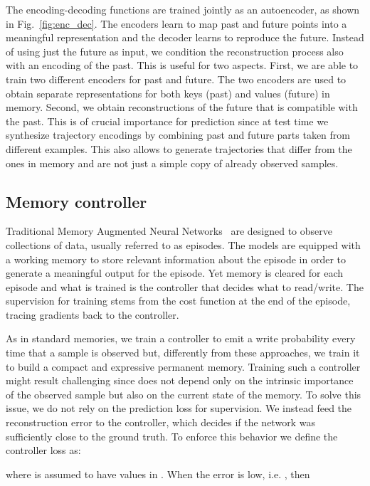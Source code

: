 \documentclass[10pt,twocolumn,letterpaper]{article}
\begin{document}
The encoding-decoding functions  are trained jointly as an autoencoder, as shown in Fig.~\ref{fig:enc_dec}.
The encoders learn to map past and future points into a meaningful representation and the decoder learns to reproduce the future. Instead of using just the future as input, we condition the reconstruction process also with an encoding of the past. This is useful for two aspects. First, we are able to train two different encoders for past and future. The two encoders are used to obtain separate representations for both keys (past) and values (future) in memory. Second, we obtain reconstructions of the future that is compatible with the past. This is of crucial importance for prediction since at test time we synthesize trajectory encodings by combining past and future parts taken from different examples. This also allows to generate trajectories that differ from the ones in memory and are not just a simple copy of already observed samples.


\subsection{Memory controller}

Traditional Memory Augmented Neural Networks~\cite{graves2014neural, weston2014memory, sukhbaatar2015end} are designed to observe collections of data, usually referred to as episodes. The models are equipped with a working memory to store relevant information about the episode in order to generate a meaningful output for the episode. Yet memory is cleared for each episode and what is trained is the controller that decides what to read/write. The supervision for training stems from the cost function at the end of the episode, tracing gradients back to the controller.

As in standard memories, we train a controller to emit a write probability  every time that a sample is observed but, differently from these approaches, we train it to build a compact and expressive permanent memory.
Training such a controller might result challenging since  does not depend only on the intrinsic importance of the observed sample but also on the current state of the memory. To solve this issue, we do not rely on the prediction loss for supervision. We instead feed the reconstruction error  to the controller, which decides if the network was sufficiently close to the ground truth. To enforce this behavior we define the controller loss  as:

where  is assumed to have values in .
When the error is low, i.e. , then
\end{document}
